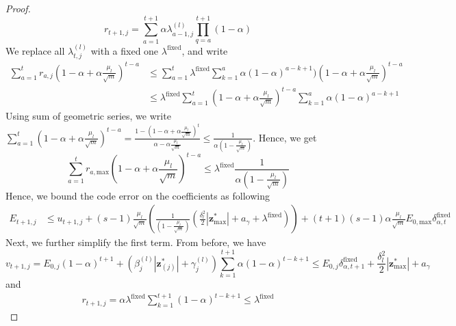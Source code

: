 \documentclass[10pt]{article} %
\newcommand{\z}{{\bm z}}
\begin{document}
\begin{proof}
\begin{equation}
r_{t+1, j} = \sum_{a=1}^{t+1} \alpha \lambda_{a-1, j}^{(l)} \prod_{q=a}^{t+1} (1 - \alpha)
\end{equation} 
We replace all $\lambda_{t,j}^{(l)}$ with a fixed one $\lambda^{\text{fixed}}$, and write
\begin{equation}
\begin{aligned}
\sum_{a=1}^{t} r_{a, j} (1 - \alpha + \alpha \frac{\mu_l}{\sqrt{m}})^{t - a} &\leq \sum_{a=1}^t \lambda^{\text{fixed}} \sum_{k=1}^{a} \alpha (1 - \alpha)^{a-k+1}) (1 - \alpha + \alpha \frac{\mu_l}{\sqrt{m}})^{t - a}\\
&\leq \lambda^{\text{fixed}} \sum_{a=1}^t (1 - \alpha + \alpha \frac{\mu_l}{\sqrt{m}})^{t - a} \sum_{k=1}^{a} \alpha (1 - \alpha)^{a-k+1}
\end{aligned}
\end{equation} 
Using sum of geometric series, we write $\sum_{a=1}^t (1 - \alpha + \alpha \frac{\mu_l}{\sqrt{m}})^{t - a} = \frac{1 - (1 - \alpha + \alpha \frac{\mu_l}{\sqrt{m}})^t}{\alpha - \alpha \frac{\mu_l}{\sqrt{m}}} \leq \frac{1}{\alpha  (1 - \frac{\mu_l}{\sqrt{m}})}$. Hence, we get
\begin{equation}
\sum_{a=1}^{t} r_{a, \text{max}} (1 - \alpha + \alpha \frac{\mu_l}{\sqrt{m}})^{t - a} \leq \lambda^{\text{fixed}} \frac{1}{\alpha  (1 - \frac{\mu_l}{\sqrt{m}})} 
\end{equation}
Hence, we bound the code error on the coefficients as following
\begin{equation}
\begin{aligned}
E_{t+1, j} &\leq u_{t+1, j} + (s-1) \frac{\mu_l}{\sqrt{m}} ( \frac{1}{(1 - \frac{\mu_l}{\sqrt{m}})} (\frac{\delta_l^2}{2} | \z_{\text{max}}^{\ast}| + a_{\gamma} + \lambda^{\text{fixed}})) + (t+1) (s-1) \alpha \frac{\mu_l}{\sqrt{m}} E_{0, \text{max}} \delta_{\alpha,t}^{\text{fixed}}
\end{aligned}
\end{equation}
Next, we further simplify the first term. From before, we have
\begin{equation}
v_{t+1, j} = E_{0, j} (1 - \alpha)^{t+1} + (\beta_j^{(l)} | \z^{\ast}_{(j)} | + \gamma_j^{(l)}) \sum_{k=1}^{t+1} \alpha (1 - \alpha)^{t-k+1}
\leq E_{0, j} \delta_{\alpha,t+1}^{\text{fixed}} + \frac{\delta_l^2}{2} | \z^{\ast}_{\text{max}} | + a_{\gamma}
\end{equation}
and
\begin{equation}
\begin{aligned}
r_{t+1, j} = \alpha \lambda^{\text{fixed}} \sum_{k=1}^{t+1} (1 - \alpha)^{t-k+1} \leq \lambda^{\text{fixed}}

\end{aligned}
\end{equation}
\end{proof}
\end{document}
